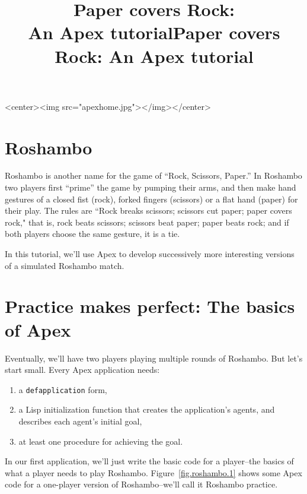 \documentclass[12pt]{article}
\title{\textbf{Paper covers Rock:\\An Apex tutorial}}
\title{Paper covers Rock: An Apex tutorial}
\author{}
\date{}
\newcommand{\ic}{\texttt}
\begin{document}
\maketitle
\htmlonly \rawhtml <center><img src="apexhome.jpg"></img></center>\endrawhtml \endhtmlonly

\tableofcontents
\newpage
\section{Roshambo}


Roshambo is another name for the game of ``Rock, Scissors, Paper.'' In Roshambo two players first ``prime'' the game by pumping their arms, and then make hand gestures of a closed fist (rock), forked fingers (scissors) or a flat hand (paper) for their play. The rules are ``Rock breaks scissors; scissors cut paper; paper covers rock," that is, rock beats scissors; scissors beat paper; paper beats rock; and if both players choose the same gesture, it is a tie. 

In this tutorial, we'll use Apex to develop successively more interesting versions of a simulated Roshambo match.

\htmlpagebreak
\section{Practice makes perfect: The basics of Apex}

Eventually, we'll have two players playing multiple rounds of Roshambo. But let's start small. Every Apex application needs:

\begin{enumerate}
\item a \ic{defapplication} form,
\item a Lisp initialization function that creates the application's agents, and describes each agent's initial goal,
\item at least one procedure for achieving the goal.
\end{enumerate}

\noindent In our first application, we'll just write the basic code for a player--the basics of what a player needs to play Roshambo. Figure~\ref{fig.roshambo.1} shows some Apex code for a one-player version of Roshambo--we'll call it Roshambo practice.
\end{document}
